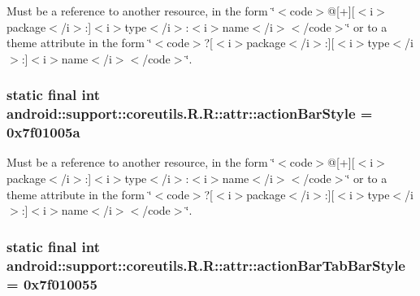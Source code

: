 Must be a reference to another resource, in the form \char`\"{}$<$code$>$@\mbox{[}+\mbox{]}\mbox{[}$<$i$>$package$<$/i$>$:\mbox{]}$<$i$>$type$<$/i$>$:$<$i$>$name$<$/i$>$$<$/code$>$\char`\"{} or to a theme attribute in the form \char`\"{}$<$code$>$?\mbox{[}$<$i$>$package$<$/i$>$:\mbox{]}\mbox{[}$<$i$>$type$<$/i$>$:\mbox{]}$<$i$>$name$<$/i$>$$<$/code$>$\char`\"{}. \hypertarget{classandroid_1_1support_1_1coreutils_1_1_r_1_1attr_487bbaf42bd039466ed2cfa6d81b561f}{
\subsubsection[{actionBarStyle}]{\setlength{\rightskip}{0pt plus 5cm}static final int android::support::coreutils.R.R::attr::actionBarStyle = 0x7f01005a}}
\label{classandroid_1_1support_1_1coreutils_1_1_r_1_1attr_487bbaf42bd039466ed2cfa6d81b561f}


Must be a reference to another resource, in the form \char`\"{}$<$code$>$@\mbox{[}+\mbox{]}\mbox{[}$<$i$>$package$<$/i$>$:\mbox{]}$<$i$>$type$<$/i$>$:$<$i$>$name$<$/i$>$$<$/code$>$\char`\"{} or to a theme attribute in the form \char`\"{}$<$code$>$?\mbox{[}$<$i$>$package$<$/i$>$:\mbox{]}\mbox{[}$<$i$>$type$<$/i$>$:\mbox{]}$<$i$>$name$<$/i$>$$<$/code$>$\char`\"{}. \hypertarget{classandroid_1_1support_1_1coreutils_1_1_r_1_1attr_ada0ea9359076ac78ea08a630664142c}{
\subsubsection[{actionBarTabBarStyle}]{\setlength{\rightskip}{0pt plus 5cm}static final int android::support::coreutils.R.R::attr::actionBarTabBarStyle = 0x7f010055}}
\label{classandroid_1_1support_1_1coreutils_1_1_r_1_1attr_ada0ea9359076ac78ea08a630664142c}



